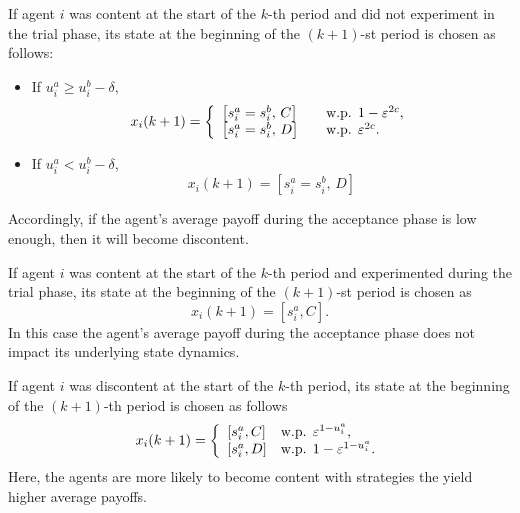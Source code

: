 %
%
If agent $i$ was content at the start of the $k$-th period and did not experiment in the trial phase, its state at the beginning of the $(k+1)$-st period is chosen as follows:
\begin{itemize}%
\item If $u_i^a \geq u_i^b - \delta,$
\begin{equation}\label{e:state trans1a}
x_i(k+1) = \left\{
\begin{array}{ll}
\left[s_i^a = s_i^b,\, C\right] &\quad\text{w.p. }1-\varepsilon^{2c}, \\
\left[s_i^a = s_i^b,\, D\right] &\quad\text{w.p. } \varepsilon^{2c}.
\end{array}\right.
\end{equation}
\item If $u_i^a < u_i^b - \delta$,
\begin{equation}\label{e:state trans1b}
x_i(k+1) = 
\left[s_i^a = s_i^b,\, D\right] 
\end{equation}
\end{itemize}
%
Accordingly, if the agent's average payoff during the acceptance phase is low enough, then it will become discontent.  

\vspace{.1cm}

%
%
If agent $i$ was content at the start of the $k$-th period and experimented during the trial phase, its state at the beginning of the $(k+1)$-st period is chosen as 
\begin{equation}\label{e:state trans2}
x_i(k+1) = \left[s_i^a, C\right].
\end{equation}
%
In this case the agent's average payoff during the acceptance phase does not impact its underlying state dynamics.  

\vspace{.1cm}

%
%
If agent $i$ was discontent at the start of the $k$-th period, its state at the beginning of the $(k+1)$-th period is chosen as follows
%
\begin{equation}\label{e:D state trans}
x_i(k+1) = \left\{
\begin{array}{ll}
\left[s_i^a, C\right] &\text{w.p. }  \varepsilon^{1-u_i^a}, \\
\left[s_i^a, D\right] &\text{w.p. } 1 - \varepsilon^{1-u_i^a}. 
\end{array}\right.
\end{equation}
%
Here, the agents are more likely to become content with strategies the yield higher average payoffs. 


